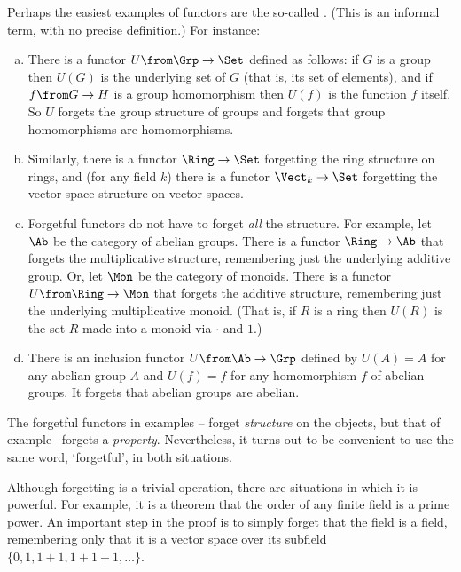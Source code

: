 \begin{examples} 
\label{egs:forgetful-functors}
Perhaps the easiest examples of functors are the so-called .  (This is an informal term, with no precise definition.)  For
instance:
% 
\begin{enumerate}[(b)]
\item   
\label{eg:forgetful-groups}
There is a functor $U\from \Grp \to \Set$ defined as follows: if $G$ is a
group then $U(G)$ is the underlying%
%
%
set of $G$ (that is, its set of elements), and if $f\from G \to H$ is a
group homomorphism then $U(f)$ is the function $f$ itself.  So $U$ forgets
the group structure of groups and forgets that group homomorphisms are
homomorphisms.

\item   
\label{eg:forgetful-ring-vs}
Similarly, there is a functor $\Ring \to \Set$ forgetting the ring
structure on rings, and (for any field $k$) there is a functor $\Vect_k
\to \Set$ forgetting the vector space structure on vector spaces.

\item   
\label{eg:forgetful-part}
Forgetful functors do not have to forget \emph{all} the structure.  For
example, let $\Ab$%
%
%
be the category of abelian groups.  There is a functor $\Ring \to \Ab$ that
forgets the multiplicative structure, remembering just the underlying
additive group.  Or, let $\Mon$%
%
%
be the category of monoids.  There is a functor $U\from \Ring \to \Mon$
that forgets the additive structure, remembering just the underlying%
%
%
multiplicative monoid.  (That is, if $R$ is a ring then $U(R)$ is the set
$R$ made into a monoid via $\cdot$ and $1$.)

\item   
\label{eg:forgetful-ab}
There is an inclusion functor $U\from \Ab \to \Grp$ defined by $U(A) = A$
for any abelian group $A$ and $U(f) = f$ for any homomorphism $f$ of abelian
groups.  It forgets that abelian groups are abelian.
\end{enumerate}

The forgetful functors in examples
-- forget
\emph{structure} on the objects, but that of
example~ forgets a \emph{property}.  Nevertheless,
it turns out to be convenient to use the same word, `forgetful', in both
situations.

Although forgetting is a trivial operation, there are situations in which
it is powerful.  For example, it is a theorem that the order of any finite
field is a prime power.  An important step in the proof is to simply forget
that the field is a field, remembering only that it is a vector space over
its subfield $\{0, 1, 1 + 1, 1 + 1 + 1, \ldots\}$.
\end{examples}

